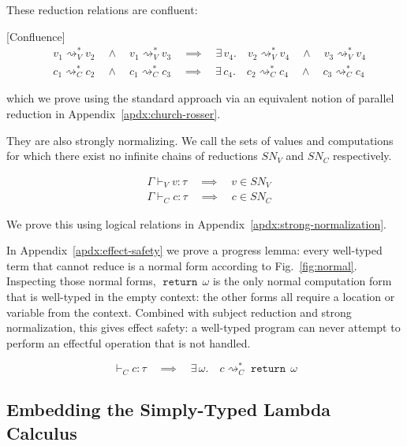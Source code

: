 \documentclass[acmsmall, screen, review, anonymous]{acmart}
\theoremstyle{definition}
\newcommand{\types}{\mathrel{:}}
\newcommand{\returnname}{\mathop{\mathtt{return}}}
\newcommand{\return}[1]{\returnname\, #1}
\newcommand{\turnv}{\mathrel{\vdash_V}}
\newcommand{\turnc}{\mathrel{\vdash_C}}
\newcommand{\stepstoname}{\rightsquigarrow}
\newcommand{\reducestoname}{\stepstoname^{*}}
\newcommand{\reducestov}{\reducestoname_{V}}
\newcommand{\reducestoc}{\reducestoname_{C}}
\newcommand{\snv}{SN_V}
\newcommand{\snc}{SN_C}
\begin{document}
These reduction relations are confluent:
\begin{theorem}
\label{lemma:church-rosser}[Confluence]
  \begin{align*}
    &v_1 \reducestov v_2
      \quad \wedge \quad v_1 \reducestov v_3
      \quad \implies \quad \exists\, v_4. \quad v_2 \reducestov v_4
      \quad \wedge \quad v_3 \reducestov v_4 \\
    &c_1 \reducestoc c_2
      \quad \wedge \quad c_1 \reducestoc c_3
      \quad \implies \quad \exists\, c_4. \quad c_2 \reducestoc c_4
      \quad \wedge \quad c_3 \reducestoc c_4
  \end{align*}
\end{theorem}
which we prove using the standard approach via an equivalent notion of
parallel reduction in Appendix~\ref{apdx:church-rosser}.

They are also strongly normalizing. We call the sets of values and
computations for which there exist no infinite chains
of reductions $\snv$ and $\snc$ respectively.
\begin{theorem}
\label{lemma:strong-normalization}
\begin{align*}
    &\Gamma \turnv v \types \tau
      \quad \implies \quad v \in \snv \\
    &\Gamma \turnc c \types \tau
      \quad \implies \quad c \in \snc
\end{align*}
\end{theorem}
We prove this using logical relations in
Appendix~\ref{apdx:strong-normalization}.

In Appendix~\ref{apdx:effect-safety} we prove a progress lemma: every
well-typed term that cannot reduce is a normal form according to
Fig.~\ref{fig:normal}. Inspecting those normal forms, $\return{\omega}$
is the only normal computation form that is well-typed in the empty
context: the other forms all require a location or variable from the
context. Combined with subject reduction and strong normalization, this
gives effect safety: a well-typed program can never attempt to perform
an effectful operation that is not handled.
\begin{theorem}
\label{lemma:effect-safety}
  \begin{equation*}
    \turnc c \types \tau
    \quad \implies \quad
    \exists\, \omega. \quad c \reducestoc \return{\omega}
  \end{equation*}
\end{theorem}

\subsection{Embedding the Simply-Typed Lambda Calculus}
\end{document}
